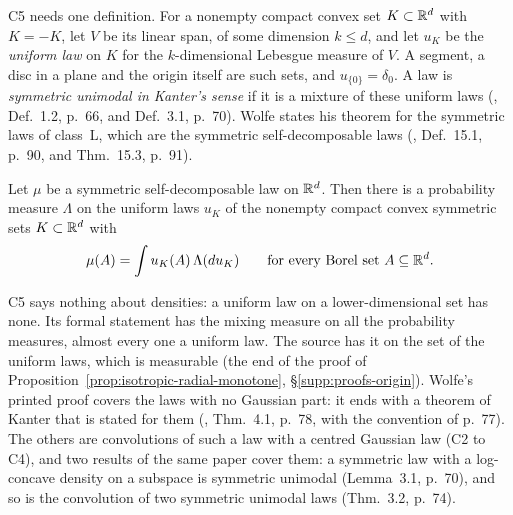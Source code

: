 C5 needs one definition. For a nonempty compact convex set $K \subset \mathbb{R}^d$ with $K = -K$,
let $V$ be its linear span, of some dimension $k \le d$, and let $u_K$ be the \emph{uniform law} on
$K$ for the $k$-dimensional Lebesgue measure of $V$. A segment, a disc in a plane and the origin
itself are such sets, and $u_{\{0\}} = \delta_0$. A law is \emph{symmetric unimodal in Kanter's
sense} if it is a mixture of these uniform laws (, Def.~1.2, p.~66,
and Def.~3.1, p.~70). Wolfe states his theorem for the symmetric laws of class~L, which are the
symmetric self-decomposable laws (, Def.~15.1, p.~90, and Thm.~15.3, p.~91).

\begin{theorem}\label{thm:cited-A8}
Let $\mu$ be a symmetric self-decomposable law on $\mathbb{R}^d$. Then there is a probability measure
$\Lambda$ on the uniform laws $u_K$ of the nonempty compact convex symmetric sets $K \subset \mathbb{R}^d$ with
\[
  \mu(A) = \int u_K(A)\,\Lambda(du_K) \qquad \text{for every Borel set } A \subseteq \mathbb{R}^d .
\]
\end{theorem}

C5 says nothing about densities: a uniform law on a lower-dimensional set has none. Its formal
statement has the mixing measure on all the probability measures, almost every one a uniform law.
The source has it on the set of the uniform laws, which is measurable
(the end of the proof of
Proposition~\ref{prop:isotropic-radial-monotone}, \S\ref{supp:proofs-origin}). Wolfe's printed proof covers the laws with no
Gaussian part: it ends with a
theorem of Kanter that is stated for them (, Thm.~4.1, p.~78, with
the convention of p.~77). The others are convolutions of such a law with a centred Gaussian law
(C2 to C4), and two results of the same paper cover them: a symmetric law with a log-concave
density on a subspace is symmetric unimodal (Lemma~3.1, p.~70), and so is the convolution of two
symmetric unimodal laws (Thm.~3.2, p.~74).


